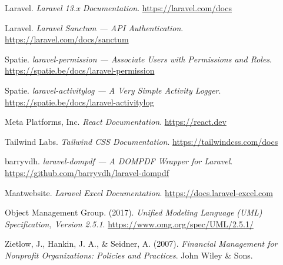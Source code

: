 
\begin{enumerate}[leftmargin=1.6cm, label={[\arabic*]}]

\item Laravel. \textit{Laravel 13.x Documentation}. \url{https://laravel.com/docs}

\item Laravel. \textit{Laravel Sanctum --- API Authentication}. \url{https://laravel.com/docs/sanctum}

\item Spatie. \textit{laravel-permission --- Associate Users with Permissions and Roles}. \url{https://spatie.be/docs/laravel-permission}

\item Spatie. \textit{laravel-activitylog --- A Very Simple Activity Logger}. \url{https://spatie.be/docs/laravel-activitylog}

\item Meta Platforms, Inc. \textit{React Documentation}. \url{https://react.dev}

\item Tailwind Labs. \textit{Tailwind CSS Documentation}. \url{https://tailwindcss.com/docs}

\item barryvdh. \textit{laravel-dompdf --- A DOMPDF Wrapper for Laravel}. \url{https://github.com/barryvdh/laravel-dompdf}

\item Maatwebsite. \textit{Laravel Excel Documentation}. \url{https://docs.laravel-excel.com}

\item Object Management Group. (2017). \textit{Unified Modeling Language (UML) Specification, Version 2.5.1}. \url{https://www.omg.org/spec/UML/2.5.1/}

\item Zietlow, J., Hankin, J. A., \& Seidner, A. (2007). \textit{Financial Management for Nonprofit Organizations: Policies and Practices}. John Wiley \& Sons.

\end{enumerate}
